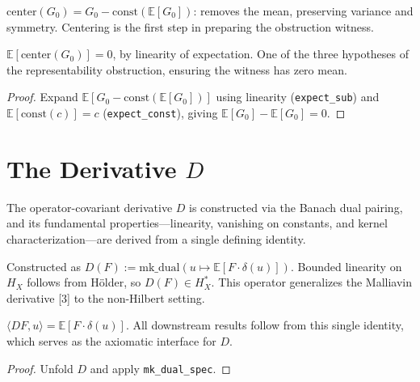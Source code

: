 \begin{defn}[Centering]\label{def:center}
\leanok
{}
$\mathrm{center}(G_0) = G_0 - \mathrm{const}(\mathbb{E}[G_0])$: removes the mean,
preserving variance and symmetry.
Centering is the first step in preparing the obstruction witness.
\end{defn}

\begin{theorem}\label{thm:center_centered}
\leanok
{}
$\mathbb{E}[\mathrm{center}(G_0)] = 0$, by linearity of expectation.
One of the three hypotheses of the representability obstruction, ensuring the witness has zero mean.
\end{theorem}
\begin{proof}\leanok Expand $\mathbb{E}[G_0 - \mathrm{const}(\mathbb{E}[G_0])]$ using linearity (\texttt{expect\_sub}) and $\mathbb{E}[\mathrm{const}(c)] = c$ (\texttt{expect\_const}), giving $\mathbb{E}[G_0] - \mathbb{E}[G_0] = 0$.\end{proof}

\section{The Derivative $D$}

The operator-covariant derivative $D$ is constructed via the Banach dual pairing, and its fundamental properties---linearity, vanishing on constants, and kernel characterization---are derived from a single defining identity.

\begin{defn}\label{def:D}
\leanok
{}
Constructed as $D(F) := \mathrm{mk\_dual}(u \mapsto \mathbb{E}[F \cdot \delta(u)])$.
Bounded linearity on $H_X$ follows from Hölder, so $D(F) \in H_X^*$.
This operator generalizes the Malliavin derivative [3] to the non-Hilbert setting.
\end{defn}

\begin{theorem}\label{thm:D_def}
\leanok
{}
$\langle DF, u \rangle = \mathbb{E}[F \cdot \delta(u)]$.
All downstream results follow from this single identity, which serves as the axiomatic interface for $D$.
\end{theorem}
\begin{proof}\leanok Unfold $D$ and apply \texttt{mk\_dual\_spec}.\end{proof}

